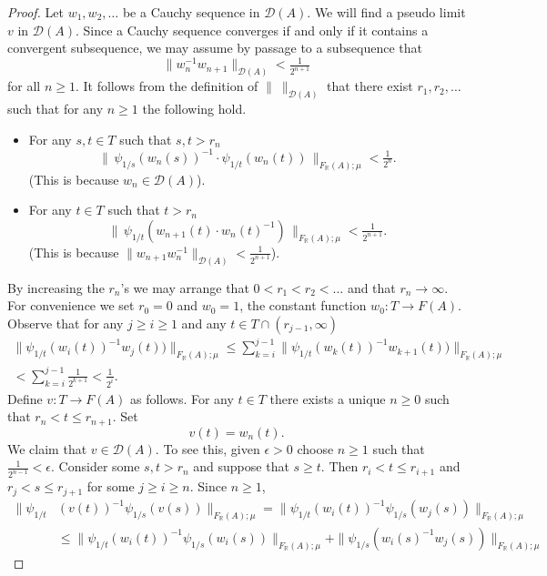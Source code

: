 \documentclass[12pt]{amsart}
\theoremstyle{definition}
\def\RR{\ensuremath{\mathbb{R}}}
\newcommand{\C}[1]{\mathcal{#1}}
\def\Free{F}
\begin{document}
\begin{proof}
Let $w_1,w_2,\dots$ be a Cauchy sequence in $\C D(A)$.
We will find a pseudo limit $v$ in $\C D(A)$.
Since a Cauchy sequence converges if and only if it contains a convergent subsequence, we may assume by passage to a subsequence that 
\[
\|w_n^{-1}w_{n+1}\|_{\C D(A)} < \tfrac{1}{2^{n+1}}
\]
for all $n \geq 1$.
It follows from the definition of $\| \ \|_{\C D(A)}$ that there exist $r_1,r_2,\dots$ such that for any $n \geq 1$ the following hold.
\begin{itemize}
\item[(a)] 
For any $s,t \in T$ such that $s,t > r_n$ 
\[
\| \, \psi_{1/s}(w_n(s))^{-1} \cdot \psi_{1/t}(w_n(t)) \, \|_{\Free_\RR(A);\mu} < \tfrac{1}{2^{n}}.
\]
(This is because $w_n \in \C D(A)$).

\item[(b)]
For any $t \in T$ such that $t>r_n$ 
\[
\| \, \psi_{1/t}(w_{n+1}(t) \cdot w_n(t)^{-1})\, \|_{\Free_\RR(A);\mu} < \tfrac{1}{2^{n+1}}.
\]
(This is because $\|w_{n+1}w_n^{-1}\|_{\C D(A)}<\tfrac{1}{2^{n+1}}$).
\end{itemize}
By increasing the $r_n$'s we may arrange that $0<r_1<r_2< \dots$ and that $r_n \to \infty$.
For convenience we set $r_0=0$ and $w_0=1$, the constant function $w_0 \colon T \to \Free(A)$.
Observe that for any $j \geq i \geq 1$  and any  $t \in T \cap (r_{j-1},\infty)$
\begin{multline*}
\|\psi_{1/t}(w_i(t))^{-1} w_j(t))\|_{\Free_\RR(A);\mu} \leq
\sum_{k=i}^{j-1} \|\psi_{1/t}(w_k(t))^{-1} w_{k+1}(t))\|_{\Free_\RR(A);\mu} %
\\
<
\sum_{k=i}^{j-1} \tfrac{1}{2^{k+1}} < \tfrac{1}{2^{i}}.
\end{multline*}
Define $v \colon T \to \Free(A)$ as follows.
For any $t \in T$ there exists a unique $n \geq 0$ such that $r_n< t \leq r_{n+1}$.
Set
\[
v(t)=w_n(t).
\]
We claim that $v \in \C D(A)$.
To see this, given $\epsilon>0$ choose $n \geq 1$ such that $\tfrac{1}{2^{n-1}}<\epsilon$.
Consider some  $s, t > r_n$ and suppose that $s \geq t$.
Then $r_{i}<t \leq r_{i+1}$ and $r_{j}<s\leq r_{j+1}$ for some $j \geq i \geq n$.
Since $n \geq 1$,
\begin{align*}
\| \psi_{1/t}  & (v(t))^{-1}  \psi_{1/s}(v(s))\|_{\Free_\RR(A);\mu}  =  \| \psi_{1/t}(w_i(t))^{-1} \psi_{1/s}(w_j(s))\|_{\Free_\RR(A);\mu}
\\ 
& \leq 
\| \psi_{1/t}(w_i(t))^{-1} \psi_{1/s}(w_i(s))\|_{\Free_\RR(A);\mu} + \| \psi_{1/s}(w_i(s)^{-1} w_j(s))\|_{\Free_\RR(A);\mu}

\end{align*}
\end{proof}
\end{document}
